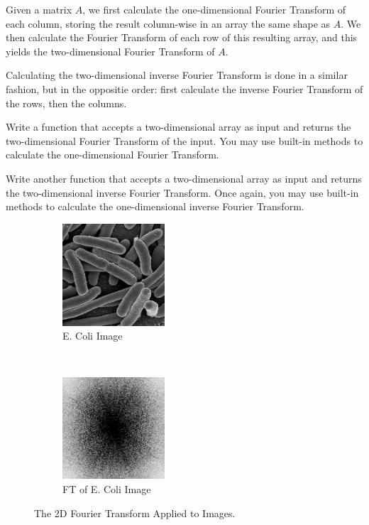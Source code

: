Given a matrix $A$, we first calculate the one-dimensional Fourier Transform of each column, storing the
result column-wise in an array the same shape as $A$.
We then calculate the Fourier Transform of each row of this resulting array, and this yields the two-dimensional Fourier Transform of $A$.

Calculating the two-dimensional inverse Fourier Transform is done in a similar fashion, but in the
oppositie order: first calculate the inverse Fourier Transform of the rows, then the columns.

\begin{problem}
Write a function  that accepts a two-dimensional array as input and returns the two-dimensional Fourier Transform of the input.
You may use built-in methods to calculate the one-dimensional Fourier Transform.

Write another function  that accepts a two-dimensional array as input and returns the two-dimensional inverse Fourier Transform.
Once again, you may use built-in methods to calculate the one-dimensional inverse Fourier Transform.
\end{problem}

\begin{figure}
\begin{subfigure}[t]{0.4\textwidth}
\centering
\includegraphics[height=1.5in]{ecoli.jpg}
\caption*{E. Coli Image}
\end{subfigure}
~
\begin{subfigure}[t]{0.4\textwidth}
\centering
\includegraphics[height=1.5in]{ecoliFFT.pdf}
\caption*{FT of E. Coli Image}
\end{subfigure}
\caption{The 2D Fourier Transform Applied to Images.}
\label{fourierext:2dfft}
\end{figure}

